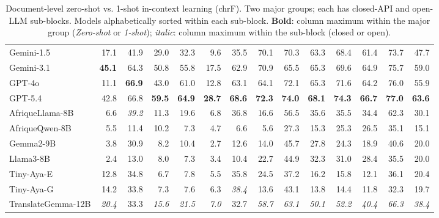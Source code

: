 \begin{table}[t]
\begin{tabular}{lrrrrrrrrrrrrr}
\midrule
Gemini-1.5 & 17.1 & 41.9 & 29.0 & 32.3 & 9.6 & 35.5 & 70.1 & 70.3 & 63.3 & 68.4 & 61.4 & 73.7 & 47.7 \\
Gemini-3.1 & \textbf{45.1} & 64.3 & 50.8 & 55.8 & 17.5 & 62.9 & 70.9 & 65.5 & 65.3 & 69.6 & 64.9 & 75.7 & 59.0 \\
GPT-4o & 11.1 & \textbf{66.9} & 43.0 & 61.0 & 12.8 & 63.1 & 64.1 & 72.1 & 65.3 & 71.6 & 64.2 & 76.0 & 55.9 \\
GPT-5.4 & 42.8 & 66.8 & \textbf{59.5} & \textbf{64.9} & \textbf{28.7} & \textbf{68.6} & \textbf{72.3} & \textbf{74.0} & \textbf{68.1} & \textbf{74.3} & \textbf{66.7} & \textbf{77.0} & \textbf{63.6} \\
\midrule
AfriqueLlama-8B & 6.6 & \emph{39.2} & 11.3 & 19.6 & 6.8 & 36.8 & 16.6 & 56.5 & 35.6 & 35.5 & 34.4 & 62.3 & 30.1 \\
AfriqueQwen-8B & 5.5 & 11.4 & 10.2 & 7.3 & 4.7 & 6.6 & 5.6 & 27.3 & 15.3 & 25.3 & 26.5 & 35.1 & 15.1 \\
Gemma2-9B & 3.8 & 30.9 & 8.2 & 10.4 & 2.7 & 12.6 & 14.0 & 45.7 & 27.8 & 24.3 & 18.9 & 40.6 & 20.0 \\
Llama3-8B & 2.4 & 13.0 & 8.0 & 7.3 & 3.4 & 10.4 & 22.7 & 44.9 & 32.3 & 31.0 & 28.4 & 35.5 & 20.0 \\
Tiny-Aya-E & 12.8 & 34.8 & 6.7 & 7.8 & 5.5 & 35.8 & 24.5 & 37.2 & 16.2 & 15.8 & 12.1 & 36.1 & 20.4 \\
Tiny-Aya-G & 14.2 & 33.8 & 7.3 & 7.6 & 6.3 & \emph{38.4} & 13.6 & 43.1 & 13.8 & 14.4 & 11.8 & 32.3 & 19.7 \\
TranslateGemma-12B & \emph{20.4} & 33.3 & \emph{15.6} & \emph{21.5} & \emph{7.0} & 32.7 & \emph{58.7} & \emph{63.1} & \emph{50.1} & \emph{52.2} & \emph{40.4} & \emph{66.3} & \emph{38.4} \\
\bottomrule
\end{tabular}
\caption{Document-level zero-shot vs. 1-shot in-context learning (chrF). Two major groups; each has closed-API and open-LLM sub-blocks. Models alphabetically sorted within each sub-block. \textbf{Bold}: column maximum within the major group (\textit{Zero-shot} or \textit{1-shot}); \emph{italic}: column maximum within the sub-block (closed or open).}
\label{tab:doc_chrf}
\end{table}
